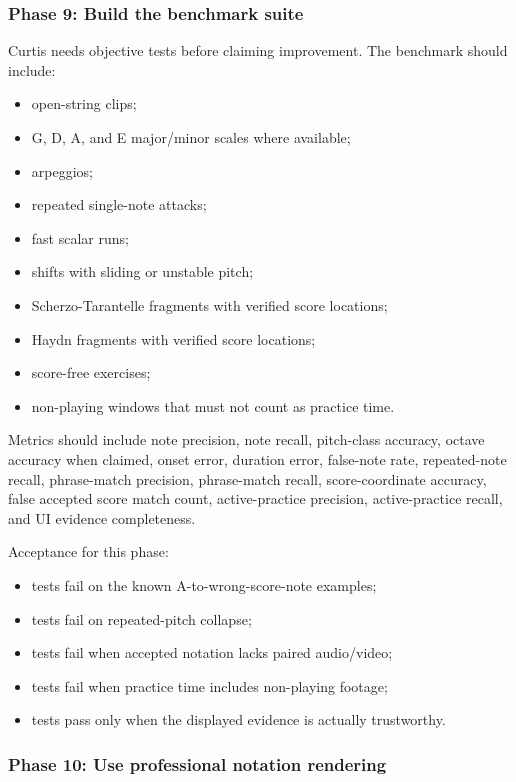 \subsubsection*{Phase 9: Build the benchmark suite}

Curtis needs objective tests before claiming improvement. The benchmark should include:

\begin{itemize}
    \item open-string clips;
    \item G, D, A, and E major/minor scales where available;
    \item arpeggios;
    \item repeated single-note attacks;
    \item fast scalar runs;
    \item shifts with sliding or unstable pitch;
    \item Scherzo-Tarantelle fragments with verified score locations;
    \item Haydn fragments with verified score locations;
    \item score-free exercises;
    \item non-playing windows that must not count as practice time.
\end{itemize}

Metrics should include note precision, note recall, pitch-class accuracy, octave accuracy when claimed, onset error, duration error, false-note rate, repeated-note recall, phrase-match precision, phrase-match recall, score-coordinate accuracy, false accepted score match count, active-practice precision, active-practice recall, and UI evidence completeness.

Acceptance for this phase:
\begin{itemize}
    \item tests fail on the known A-to-wrong-score-note examples;
    \item tests fail on repeated-pitch collapse;
    \item tests fail when accepted notation lacks paired audio/video;
    \item tests fail when practice time includes non-playing footage;
    \item tests pass only when the displayed evidence is actually trustworthy.
\end{itemize}

\subsubsection*{Phase 10: Use professional notation rendering}

